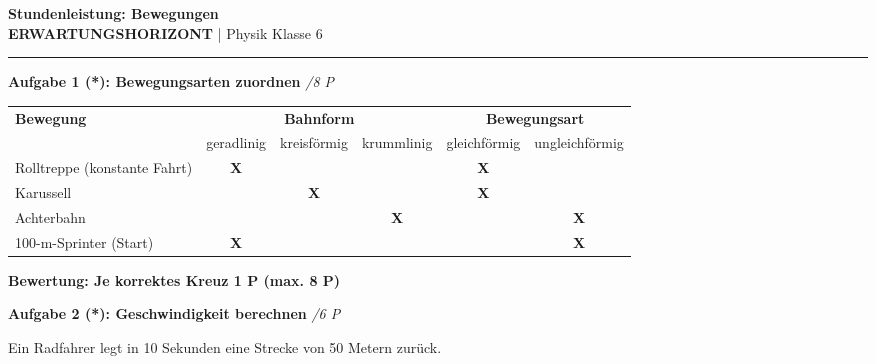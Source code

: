 \documentclass[11pt,a4paper]{article}
\newcommand{\lsg}[1]{\textcolor{loesung}{\textbf{#1}}}
\newcommand{\stern}[1]{\textbf{(#1)}}
\newcommand{\punkte}[1]{\hfill \textit{/#1 P}}
\begin{document}
\begin{center}
    {\Large\bfseries\textcolor{physik}{Stundenleistung: Bewegungen}}\\[0.3em]
    {\normalsize\textcolor{loesung}{\textbf{ERWARTUNGSHORIZONT}} | Physik Klasse 6}
\end{center}

\vspace{0.5em}
\hrule
\vspace{0.8em}

\noindent\textbf{Aufgabe 1 \stern{*}: Bewegungsarten zuordnen} \punkte{8}

\vspace{0.5em}
\begin{center}
\renewcommand{\arraystretch}{1.4}
\begin{tabular}{|l|c|c|c||c|c|}
\hline
\textbf{Bewegung} & \multicolumn{3}{c||}{\textbf{Bahnform}} & \multicolumn{2}{c|}{\textbf{Bewegungsart}} \\
\cline{2-6}
& geradlinig & kreisförmig & krummlinig & gleichförmig & ungleichförmig \\
\hline
Rolltreppe (konstante Fahrt) & \lsg{X} & & & \lsg{X} & \\
\hline
Karussell & & \lsg{X} & & \lsg{X} & \\
\hline
Achterbahn & & & \lsg{X} & & \lsg{X} \\
\hline
100-m-Sprinter (Start) & \lsg{X} & & & & \lsg{X} \\
\hline
\end{tabular}
\end{center}

\vspace{0.3em}
\lsg{Bewertung: Je korrektes Kreuz 1 P (max. 8 P)}

\vspace{1em}

\noindent\textbf{Aufgabe 2 \stern{*}: Geschwindigkeit berechnen} \punkte{6}

\vspace{0.5em}
\noindent Ein Radfahrer legt in 10 Sekunden eine Strecke von 50 Metern zurück.
\end{document}
